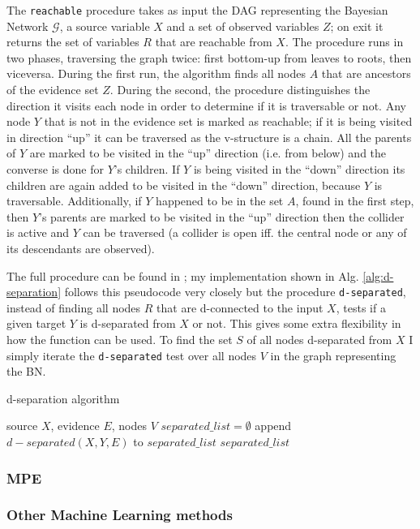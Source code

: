 The \texttt{reachable} procedure takes as input the DAG representing the Bayesian Network $\mathcal{G}$, a source variable $X$ and a set of observed variables $Z$; on exit it returns the set of variables $R$ that are reachable from $X$.
The procedure runs in two phases, traversing the graph twice: first bottom-up from leaves to roots, then viceversa.
During the first run, the algorithm finds all nodes $A$ that are ancestors of the evidence set $Z$.
During the second, the procedure distinguishes the direction it visits each node in order to determine if it is traversable or not.
Any node $Y$ that is not in the evidence set is marked as reachable; if it is being visited in direction \enquote{up} it can be traversed as the v-structure is a chain.
All the parents of $Y$ are marked to be visited in the \enquote{up} direction (i.e. from below) and the converse is done for $Y$'s children.
If $Y$ is being visited in the \enquote{down} direction its children are again added to be visited in the \enquote{down} direction, because $Y$ is traversable.
Additionally, if $Y$ happened to be in the set $A$, found in the first step, then $Y$'s parents are marked to be visited in the \enquote{up} direction then the collider is active and $Y$ can be traversed (a collider is open iff. the central node or any of its descendants are observed).

The full procedure can be found in \cite{koller2007dseparation}; my implementation shown in Alg. \ref{alg:d-separation} follows this pseudocode very closely but the procedure \texttt{d-separated}, instead of finding all nodes $R$ that are d-connected to the input $X$, tests if a given target $Y$ is d-separated from $X$ or not.
This gives some extra flexibility in how the function can be used.
To find the set $S$ of all nodes d-separated from $X$ I simply iterate the \texttt{d-separated} test over all nodes $V$ in the graph representing the BN.

\begin{algorithm}[htp!]
	\caption{d-separation algorithm}
	\label{alg:d-separation}
	\begin{algorithmic}
		 source $X$, evidence $E$, nodes $V$
		\STATE $separated\_list = \emptyset$
		\STATE append $d-separated(X, Y, E)$ to $separated\_list$ 
		\ENDFOR
		 $separated\_list$
	\end{algorithmic}
\end{algorithm}

\subsubsection{MPE}

\subsubsection{Other Machine Learning methods}


